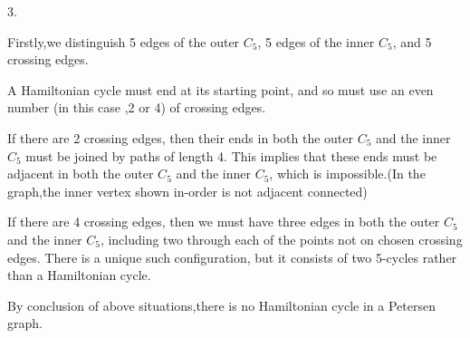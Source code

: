 \documentclass{article}
\begin{document}
3.

Firstly,we distinguish 5 edges of the outer $C_5$, 5 edges of the inner $C_5$, and 5 crossing edges.

A Hamiltonian cycle must end at its starting point, and so must use an even
number (in this case ,2 or 4) of crossing edges.

If there are 2 crossing edges, then their ends in both the outer $C_5$ and
the inner $C_5$ must be joined by paths of length 4. This implies that these
ends must be adjacent in both the outer $C_5$ and the inner $C_5$, which
is impossible.(In the graph,the inner vertex shown in-order is not adjacent connected)

If there are 4 crossing edges, then we must have three edges in both the
outer $C_5$ and the inner $C_5$, including two through each of the points
not on chosen crossing edges. There is a unique such configuration, but it consists
of two 5-cycles rather than a Hamiltonian cycle.

By conclusion of above situations,there is no Hamiltonian cycle in a Petersen graph.
\end{document}
